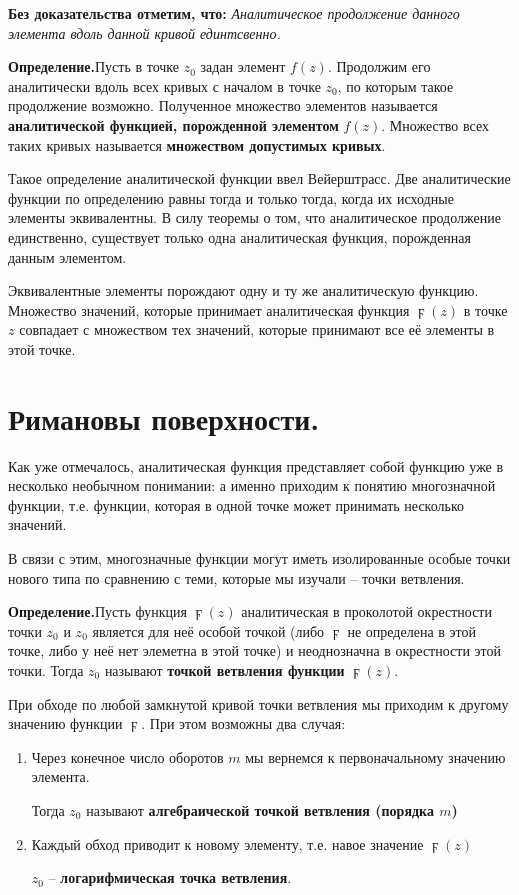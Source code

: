 \documentclass[a4paper, 12pt]{report}
\begin{document}
\textbf{Без доказательства отметим, что:}
\textit{Аналитическое продолжение данного элемента вдоль данной кривой единтсвенно.}
\par\bigskip

\textbf{Определение.}\quad Пусть в точке $z_0$ задан элемент $f(z)$. Продолжим его аналитически вдоль всех кривых с началом в точке $z_0$, по которым такое продолжение возможно. Полученное множество элементов называется \textbf{аналитической функцией, порожденной элементом} $f(z)$. Множество всех таких кривых называется \textbf{множеством допустимых кривых}. 
\par\bigskip
Такое определение аналитической функции ввел Вейерштрасс. Две аналитические функции по определению равны тогда и только тогда, когда их исходные элементы эквивалентны. В силу теоремы о том, что аналитическое продолжение единственно, существует только одна аналитическая функция, порожденная данным элементом.
\par\bigskip
Эквивалентные элементы порождают одну и ту же аналитическую функцию. Множество значений, которые принимает аналитическая функция $\digamma(z)$ в точке $z$ совпадает с множеством тех значений, которые принимают все её элементы в этой точке.


\section{Римановы поверхности.}

Как уже отмечалось, аналитическая функция представляет собой функцию уже в несколько необычном понимании: а именно приходим к понятию многозначной функции, т.е. функции, которая в одной точке может принимать несколько значений.

В связи с этим, многозначные функции могут иметь изолированные особые точки нового типа по сравнению с теми, которые мы изучали -- точки ветвления.\par\bigskip

\textbf{Определение.}\quad Пусть функция $\digamma(z)$ аналитическая в проколотой окрестности точки $z_0$ и $z_0$ является для неё особой точкой (либо $\digamma$ не определена в этой точке, либо у неё нет элеметна в этой точке) и неоднозначна в окрестности этой точки. Тогда $z_0$ называют \textbf{точкой ветвления функции} $\digamma(z)$.

\par\bigskip
При обходе по любой замкнутой кривой точки ветвления мы приходим к другому значению функции $\digamma$. При этом возможны два случая:
\begin{enumerate}
    \item Через конечное число оборотов $m$ мы вернемся к первоначальному значению элемента.
    
    Тогда $z_0$ называют \textbf{алгебраической точкой ветвления (порядка $m$)}
    \item Каждый обход приводит к новому элементу, т.е. навое значение $\digamma(z)$
    
    $z_0$ -- \textbf{логарифмическая точка ветвления}.
\end{enumerate}
\end{document}
